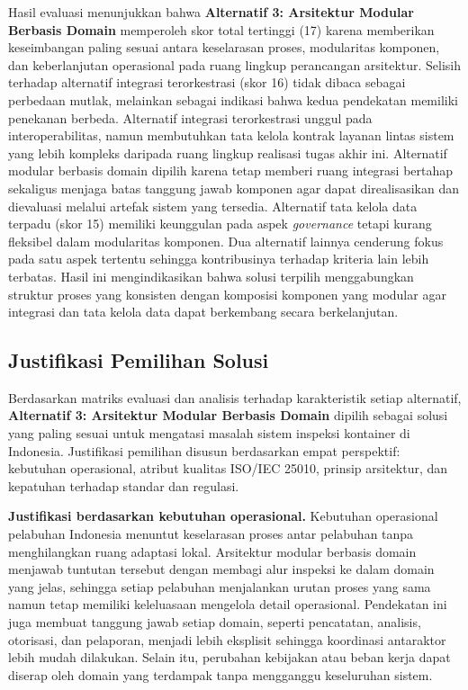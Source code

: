 Hasil evaluasi menunjukkan bahwa \textbf{Alternatif 3: Arsitektur Modular Berbasis Domain} memperoleh skor total tertinggi (17) karena memberikan keseimbangan paling sesuai antara keselarasan proses, modularitas komponen, dan keberlanjutan operasional pada ruang lingkup perancangan arsitektur. Selisih terhadap alternatif integrasi terorkestrasi (skor 16) tidak dibaca sebagai perbedaan mutlak, melainkan sebagai indikasi bahwa kedua pendekatan memiliki penekanan berbeda. Alternatif integrasi terorkestrasi unggul pada interoperabilitas, namun membutuhkan tata kelola kontrak layanan lintas sistem yang lebih kompleks daripada ruang lingkup realisasi tugas akhir ini. Alternatif modular berbasis domain dipilih karena tetap memberi ruang integrasi bertahap sekaligus menjaga batas tanggung jawab komponen agar dapat direalisasikan dan dievaluasi melalui artefak sistem yang tersedia. Alternatif tata kelola data terpadu (skor 15) memiliki keunggulan pada aspek \textit{governance} tetapi kurang fleksibel dalam modularitas komponen. Dua alternatif lainnya cenderung fokus pada satu aspek tertentu sehingga kontribusinya terhadap kriteria lain lebih terbatas. Hasil ini mengindikasikan bahwa solusi terpilih menggabungkan struktur proses yang konsisten dengan komposisi komponen yang modular agar integrasi dan tata kelola data dapat berkembang secara berkelanjutan.

\subsection{Justifikasi Pemilihan Solusi}

Berdasarkan matriks evaluasi dan analisis terhadap karakteristik setiap alternatif, \textbf{Alternatif 3: Arsitektur Modular Berbasis Domain} dipilih sebagai solusi yang paling sesuai untuk mengatasi masalah sistem inspeksi kontainer di Indonesia. Justifikasi pemilihan disusun berdasarkan empat perspektif: kebutuhan operasional, atribut kualitas ISO/IEC 25010, prinsip arsitektur, dan kepatuhan terhadap standar dan regulasi.

\textbf{Justifikasi berdasarkan kebutuhan operasional.}
Kebutuhan operasional pelabuhan Indonesia menuntut keselarasan proses antar
pelabuhan tanpa menghilangkan ruang adaptasi lokal. Arsitektur modular
berbasis domain menjawab tuntutan tersebut dengan membagi alur inspeksi ke
dalam domain yang jelas, sehingga setiap pelabuhan menjalankan urutan proses
yang sama namun tetap memiliki keleluasaan mengelola detail operasional.
Pendekatan ini juga membuat tanggung jawab setiap domain, seperti pencatatan,
analisis, otorisasi, dan pelaporan, menjadi lebih eksplisit sehingga koordinasi
antaraktor lebih mudah dilakukan. Selain itu, perubahan kebijakan atau beban
kerja dapat diserap oleh domain yang terdampak tanpa mengganggu keseluruhan
sistem.

